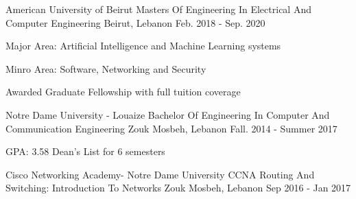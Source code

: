 

\begin{cventries}

  \cventry
    {American University of Beirut} %
    {Masters Of Engineering In Electrical And Computer Engineering} %
    {Beirut, Lebanon} %
    {Feb. 2018 - Sep. 2020} %
    {
      \begin{cvitems} %
        \item Major Area: Artificial Intelligence and Machine Learning systems
        \item Minro Area: Software, Networking and Security
        \item {Awarded Graduate Fellowship with full tuition coverage }
      \end{cvitems}
    }

  \cventry
    {Notre Dame University - Louaize} %
    {Bachelor Of Engineering In Computer And Communication Engineering} %
    {Zouk Mosbeh, Lebanon} %
    {Fall. 2014 - Summer 2017} %
    {
      \begin{cvitems} %
        \item {GPA: 3.58   Dean’s  List for 6 semesters}
      \end{cvitems}
    }


  \cventry
    {Cisco Networking Academy- Notre Dame University} %
    {CCNA Routing And Switching: Introduction To Networks} %
    {Zouk Mosbeh, Lebanon} %
    {Sep 2016 - Jan 2017} %
    {}


\end{cventries}
